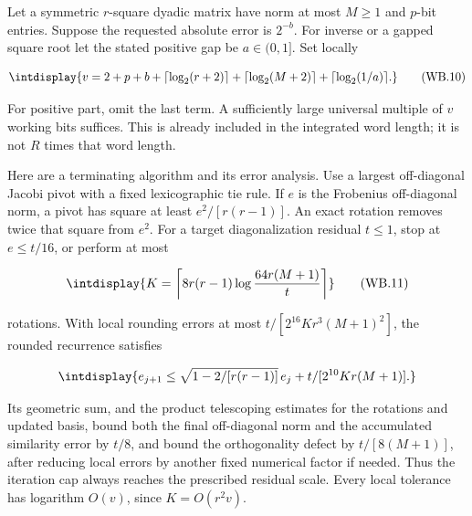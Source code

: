 
Let a symmetric \(r\)-square dyadic matrix have norm at most \(M\ge1\) and \(p\)-bit entries. Suppose the requested absolute error is \(2^{-b}\). For inverse or a gapped square root let the stated positive gap be \(a\in(0,\allowbreak 1]\). Set locally


\begingroup\renewcommand{\theHequation}{intdisplay.790}
\begin{equation}
\intdisplay{
v=2+p+b+\lceil\log_2(r+2)\rceil+
\lceil\log_2(M+2)\rceil+\lceil\log_2(1/a)\rceil.
}
\tag{WB.10}
\label{int:eq-0382-wb-10}
\end{equation}
\endgroup


For positive part, omit the last term. A sufficiently large universal multiple of \(v\) working bits suffices. This is already included in the integrated word length; it is not \(R\) times that word length.



Here are a terminating algorithm and its error analysis. Use a largest off-diagonal Jacobi pivot with a fixed lexicographic tie rule. If \(e\) is the Frobenius off-diagonal norm, a pivot has square at least \(e^2/[r(r-1)]\). An exact rotation removes twice that square from \(e^2\). For a target diagonalization residual \(t\le1\), stop at \(e\le t/16\), or perform at most


\begingroup\renewcommand{\theHequation}{intdisplay.791}
\begin{equation}
\intdisplay{
K=\left\lceil 8r(r-1)\log\frac{64r(M+1)}t\right\rceil
}
\tag{WB.11}
\label{int:eq-0383-wb-11}
\end{equation}
\endgroup


rotations. With local rounding errors at most \(t/[2^{16}K r^3(M+1)^2]\), the rounded recurrence satisfies


\begingroup\renewcommand{\theHequation}{intdisplay.792}
\begin{equation*}
\intdisplay{
e_{j+1}\le\sqrt{1-2/[r(r-1)]}\,e_j+
t/[2^{10}Kr(M+1)].
}
\end{equation*}
\endgroup


Its geometric sum, and the product telescoping estimates for the rotations and updated basis, bound both the final off-diagonal norm and the accumulated similarity error by \(t/8\), and bound the orthogonality defect by \(t/[8(M+1)]\), after reducing local errors by another fixed numerical factor if needed. Thus the iteration cap always reaches the prescribed residual scale. Every local tolerance has logarithm \(O(v)\), since \(K=O(r^2v)\).


